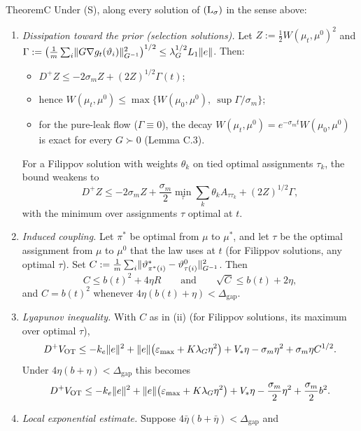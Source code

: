 \begin{thm}{Theorem}{C}
Under \textup{(S)}, along every solution of $(\mathrm{L}_\sigma)$ in the sense above:
\begin{enumerate}[label=\textup{(\roman*)}]
  \item \emph{Dissipation toward the prior \textup{(}selection solutions\textup{)}.} Let
    $Z := \frac12 W(\mu_t,\mu^0)^2$ and
    $\Gamma := \bigl(\frac1m\sum_i\lVert G\nabla g_t(\vartheta_i)\rVert^2_{G^{-1}}\bigr)^{1/2} \le
    \lambda_G^{1/2}L_1\lVert e\rVert$. Then:
    \begin{itemize}
      \item $D^+Z \le -2\sigma_m Z + (2Z)^{1/2}\Gamma(t)$;
      \item hence $W(\mu_t,\mu^0) \le \max\{W(\mu_0,\mu^0),\ \sup\Gamma/\sigma_m\}$;
      \item for the pure-leak flow \textup{(}$\Gamma\equiv0$\textup{)}, the decay
        $W(\mu_t,\mu^0) = e^{-\sigma_m t}W(\mu_0,\mu^0)$ is exact for every $G\succ0$ \textup{(}Lemma C.3\textup{)}.
    \end{itemize}
    For a Filippov solution with weights $\theta_k$ on tied optimal assignments $\tau_k$, the bound weakens to
    \[
      D^+Z \le -2\sigma_m Z + \frac{\sigma_m}{2}\min_\tau\sum_k\theta_k A_{\tau\tau_k} + (2Z)^{1/2}\Gamma,
    \]
    with the minimum over assignments $\tau$ optimal at $t$.
  \item \emph{Induced coupling.} Let $\pi^*$ be optimal from $\mu$ to $\mu^*$, and let $\tau$ be the optimal
    assignment from $\mu$ to $\mu^0$ that the law uses at $t$ \textup{(}for Filippov solutions, any optimal
    $\tau$\textup{)}. Set $C := \frac1m\sum_i\lVert \vartheta^*_{\pi^*(i)} - \vartheta^0_{\tau(i)}\rVert^2_{G^{-1}}$. Then
    \[
      C \le b(t)^2 + 4\eta R \qquad\text{and}\qquad \sqrt{C} \le b(t) + 2\eta,
    \]
    and $C = b(t)^2$ whenever $4\eta(b(t)+\eta) < \Delta_{\mathrm{gap}}$.
  \item \emph{Lyapunov inequality.} With $C$ as in \textup{(ii)} \textup{(}for Filippov solutions, its maximum over
    optimal $\tau$\textup{)},
    \[
      D^+V_{\mathrm{OT}} \le -k_e\lVert e\rVert^2 + \lVert e\rVert\bigl(\varepsilon_{\max} + K\lambda_G\eta^2\bigr) + V_*\eta
      - \sigma_m\eta^2 + \sigma_m\eta C^{1/2}.
    \]
    Under $4\eta(b+\eta) < \Delta_{\mathrm{gap}}$ this becomes
    \[
      D^+V_{\mathrm{OT}} \le -k_e\lVert e\rVert^2 + \lVert e\rVert\bigl(\varepsilon_{\max} + K\lambda_G\eta^2\bigr) + V_*\eta
      - \frac{\sigma_m}{2}\eta^2 + \frac{\sigma_m}{2}b^2.
    \]
  \item \emph{Local exponential estimate.} Suppose $4\bar\eta(b+\bar\eta) < \Delta_{\mathrm{gap}}$ and

\end{enumerate}
\end{thm}
